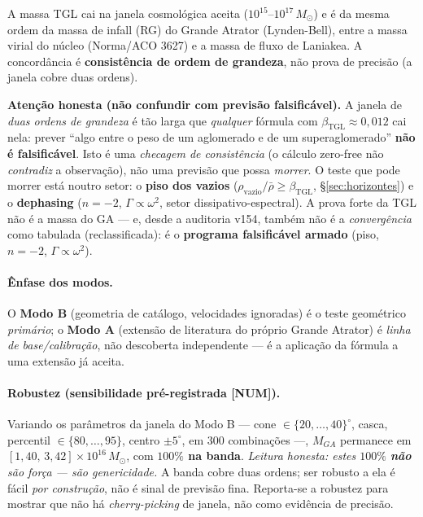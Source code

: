 \documentclass[11pt]{article}
\newcommand{\bTGL}{\beta_{\mathrm{TGL}}}\newcommand{\Msun}{M_{\odot}}\newcommand{\TGL}{\mathrm{TGL}}
\theoremstyle{definition}\newtheorem{deriv}{Derivação}
\begin{document}
A massa TGL cai na janela cosmológica aceita ($10^{15}$--$10^{17}\,\Msun$) e é da mesma ordem da massa de infall (RG) do Grande Atrator (Lynden-Bell), entre a massa virial do núcleo (Norma/ACO 3627) e a massa de fluxo de Laniakea. A concordância é \textbf{consistência de ordem de grandeza}, não prova de precisão (a janela cobre duas ordens).

\textbf{Atenção honesta (não confundir com previsão falsificável).} A janela de \emph{duas ordens de grandeza} é tão larga que \emph{qualquer} fórmula com $\bTGL\approx0{,}012$ cai nela: prever ``algo entre o peso de um aglomerado e de um superaglomerado'' \textbf{não é falsificável}. Isto é uma \emph{checagem de consistência} (o cálculo zero-free não \emph{contradiz} a observação), não uma previsão que possa \emph{morrer}. O teste que pode morrer está noutro setor: o \textbf{piso dos vazios} ($\rho_{\mathrm{vazio}}/\bar\rho\geq\bTGL$, \S\ref{sec:horizontes}) e o \textbf{dephasing} ($n=-2$, $\Gamma\propto\omega^2$, setor dissipativo-espectral). A prova forte da TGL não é a massa do GA --- e, desde a auditoria v154, também não é a \emph{convergência} como tabulada (reclassificada): é o \textbf{programa falsificável armado} (piso, $n=-2$, $\Gamma\propto\omega^2$).

\paragraph{Ênfase dos modos.} O \textbf{Modo B} (geometria de catálogo, velocidades ignoradas) é o teste geométrico \emph{primário}; o \textbf{Modo A} (extensão de literatura do próprio Grande Atrator) é \emph{linha de base/calibração}, não descoberta independente --- é a aplicação da fórmula a uma extensão já aceita.

\paragraph{Robustez (sensibilidade pré-registrada \textsf{[NUM]}).} Variando os parâmetros da janela do Modo B --- cone $\in\{20,\dots,40\}^\circ$, casca, percentil $\in\{80,\dots,95\}$, centro $\pm5^\circ$, em $300$ combinações ---, $M_{GA}$ permanece em $[1{,}40,\,3{,}42]\times10^{16}\,\Msun$, com \textbf{$100\%$ na banda}. \emph{Leitura honesta: estes $100\%$ \textbf{não} são força --- são genericidade.} A banda cobre duas ordens; ser robusto a ela é fácil \emph{por construção}, não é sinal de previsão fina. Reporta-se a robustez para mostrar que não há \emph{cherry-picking} de janela, não como evidência de precisão.
\end{document}
